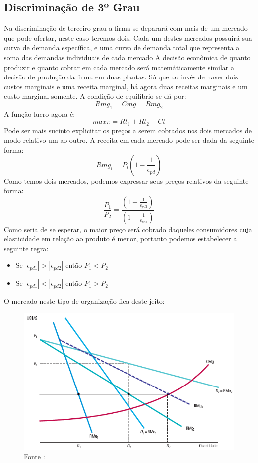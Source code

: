 \documentclass[12pt,a4paper,oneside,brazil]{abntex2}
\begin{document}
\subsection{Discriminação de 3º Grau}
Na discriminação de terceiro grau a firma se deparará com mais de um mercado que pode ofertar, neste caso teremos dois. Cada um destes mercados possuirá sua curva de demanda específica, e uma curva de demanda total que representa a soma das demandas individuais de cada mercado A decisão econômica de quanto produzir e quanto cobrar em cada mercado será matemáticamente similar a decisão de produção da firma em duas plantas. Só que ao invés de haver dois custos marginais e uma receita marginal, há agora duas receitas marginais e um custo marginal somente. A condição de equilíbrio se dá por:
\[ Rmg_1 = Cmg = Rmg_2 \]
A função lucro agora é:
\[ max \pi = Rt_1 + Rt_2 - Ct \]
Pode ser mais sucinto explicitar os preços a serem cobrados nos dois mercados de modo relativo um ao outro. A receita em cada mercado pode ser dada da seguinte forma:
\[ Rmg_i = P_i (1- \frac{1}{\epsilon_{pd}}) \]
Como temos dois mercados, podemos expressar seus preços relativos da seguinte forma:
\[ \frac{P_1}{P_2} = \frac{(1-\frac{1}{\epsilon_{pd2}})}{(1- \frac{1}{\epsilon_{pd1}})} \]
Como seria de se esperar, o maior preço será cobrado daqueles consumidores cuja elasticidade em relação ao produto é menor, portanto podemos estabelecer a seguinte regra:
\begin{itemize}
\item Se $ |\epsilon_{pd1}| > |\epsilon_{pd2}|$ então $ P_1 < P_2$
\item Se $ |\epsilon_{pd1}| < |\epsilon_{pd2}|$ então $ P_1 > P_2$
\end{itemize}
O mercado neste tipo de organização fica deste jeito:
\begin{figure}[h]
\includegraphics[scale=0.7]{Discriminação terceiro grau.png}
\centering
\caption{Fonte : \cite[p. 402]{pindyck}}
\end{figure}
\end{document}
